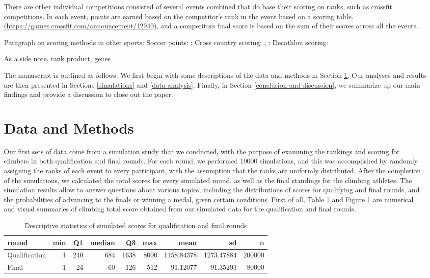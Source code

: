 \documentclass[12pt]{article}
\begin{document}
There are other individual competitions consisted of several events
combined that do base their scoring on ranks, such as crossfit
competitions. In each event, points are earned based on the competitor's
rank in the event based on a scoring table.
(\url{https://games.crossfit.com/announcement/12940}), and a competitors
final score is based on the sum of their scores across all the events.

Paragraph on scoring methods in other sports: Soccer points:
\citet{haugen2008}; Cross country scoring: \citet{hammond2007},
\citet{boudreau2018}; Decathlon scoring: \citet{westera2006}

As a side note, rank product, genes

The manuscript is outlined as follows. We first begin with some
descriptions of the data and methods in Section \ref{data-and-methods}.
Our analyses and results are then presented in Sections
\ref{simulations} and \ref{data-analysis}. Finally, in Section
\ref{conclusion-and-discussion}, we summarize up our main findings and
provide a discussion to close out the paper.

\hypertarget{data-and-methods}{%
\section{Data and Methods}\label{data-and-methods}}

Our first sets of data come from a simulation study that we conducted,
with the purpose of examining the rankings and scoring for climbers in
both qualification and final rounds. For each round, we performed 10000
simulations, and this was accomplished by randomly assigning the ranks
of each event to every participant, with the assumption that the ranks
are uniformly distributed. After the completion of the simulations, we
calculated the total scores for every simulated round, as well as the
final standings for the climbing athletes. The simulation results allow
to answer questions about various topics, including the distributions of
scores for qualifying and final rounds, and the probabilities of
advancing to the finals or winning a medal, given certain conditions.
First of all, Table 1 and Figure 1 are numerical and visual summaries of
climbing total score obtained from our simulated data for the
qualification and final rounds.

\begin{table}[H]

\caption{\label{tab:unnamed-chunk-4}Descriptive statistics of simulated scores for qualification and final rounds}
\centering
\begin{tabular}[t]{lrrrrrrrr}
\toprule
round & min & Q1 & median & Q3 & max & mean & sd & n\\
\midrule
Qualification & 1 & 240 & 684 & 1638 & 8000 & 1158.84378 & 1273.47884 & 200000\\
Final & 1 & 24 & 60 & 126 & 512 & 91.12077 & 91.35293 & 80000\\
\bottomrule
\end{tabular}
\end{table}
\end{document}
